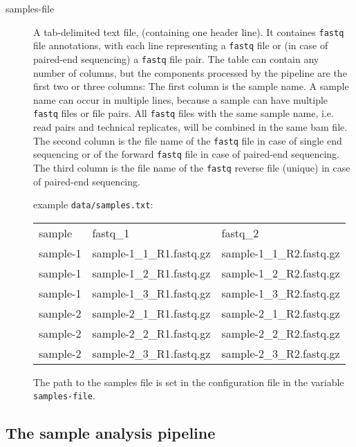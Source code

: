 \documentclass[a4paper]{article}
\begin{document}
\begin{description}

\item[samples-file] A tab-delimited text file, (containing one header
  line). It containes \texttt{fastq} file annotations, with each line
  representing a \texttt{fastq} file or (in case of paired-end
  sequencing) a \texttt{fastq} file pair. The table can contain any
  number of columns, but the components processed by the pipeline are
  the first two or three columns: The first column is the sample
  name. A sample name can occur in multiple lines, because a sample
  can have multiple \texttt{fastq} files or file pairs. All
  \texttt{fastq} files with the same sample name, i.e. read pairs and
  technical replicates, will be combined in the same bam file. The
  second column is the file name of the \texttt{fastq} file in case of
  single end sequencing or of the forward \texttt{fastq} file in case
  of paired-end sequencing. The third column is the file name of the
  \texttt{fastq} reverse file (unique) in case of paired-end
  sequencing.

  example \texttt{data/samples.txt}:

  {\scriptsize
    {\ttfamily
      \begin{tabular}{lll}
        
        sample & fastq\_1 & fastq\_2 \\
        sample-1 & sample-1\_1\_R1.fastq.gz & sample-1\_1\_R2.fastq.gz \\
        sample-1 & sample-1\_2\_R1.fastq.gz & sample-1\_2\_R2.fastq.gz \\
        sample-1 & sample-1\_3\_R1.fastq.gz & sample-1\_3\_R2.fastq.gz \\
        sample-2 & sample-2\_1\_R1.fastq.gz & sample-2\_1\_R2.fastq.gz \\
        sample-2 & sample-2\_2\_R1.fastq.gz & sample-2\_2\_R2.fastq.gz \\
        sample-2 & sample-2\_3\_R1.fastq.gz & sample-2\_3\_R2.fastq.gz \\

      \end{tabular}
    }
  }

  The path to the samples file is set in the configuration file in the
  variable \texttt{samples-file}.

\end{description}

\subsection{The sample analysis pipeline}
\label{sec:sample-analys-pipel-1}
\end{document}

